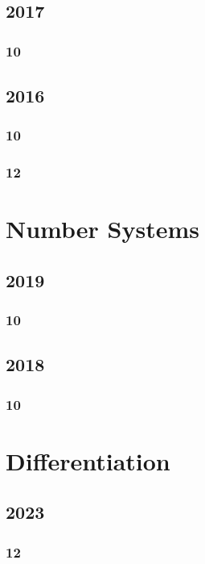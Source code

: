 \documentclass[11pt]{book}
\begin{document}
\section{2017}
\subsection{10}




\section{2016}
\subsection{10}

\subsection{12}



\chapter{Number Systems}
\section{2019}
\subsection{10}

\section{2018}
\subsection{10}




\chapter{Differentiation}
\section{2023}
\subsection{12}

\end{document}
